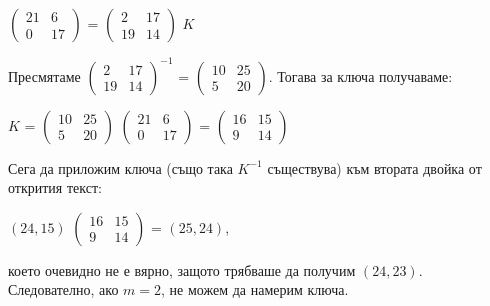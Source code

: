 \documentclass{article}
\begin{document}
\begin{center}
$\begin{pmatrix}
    21 & 6 \\
    0 & 17
\end{pmatrix}$ = $\begin{pmatrix}
                             2 & 17 \\
                             19 & 14
                         \end{pmatrix}$ $K$
\end{center}

\justify
Пресмятаме $\begin{pmatrix}
                2 & 17 \\
                19 & 14
            \end{pmatrix}^{-1}$ = $\begin{pmatrix}
                10 & 25 \\
                5 & 20
            \end{pmatrix}$. Тогава за ключа получаваме: \\
            
\begin{center}
    $K$ = $\begin{pmatrix}
                10 & 25 \\
                5 & 20
            \end{pmatrix}$ $\begin{pmatrix}
                21 & 6 \\
                0 & 17
            \end{pmatrix}$ = $\begin{pmatrix}
                16 & 15 \\
                9 & 14
            \end{pmatrix}$
\end{center}

\justify
Сега да приложим ключа (също така $K^{-1}$ съществува) към втората двойка от открития текст:

\begin{center}
    $(24,15)$ $\begin{pmatrix}
                16 & 15 \\
                9 & 14
            \end{pmatrix}$ = $(25,24)$,
\end{center}

\justify
което очевидно не е вярно, защото трябваше да получим $(24,23)$. Следователно, ако $m = 2$, не можем да намерим ключа. 
\end{document}
